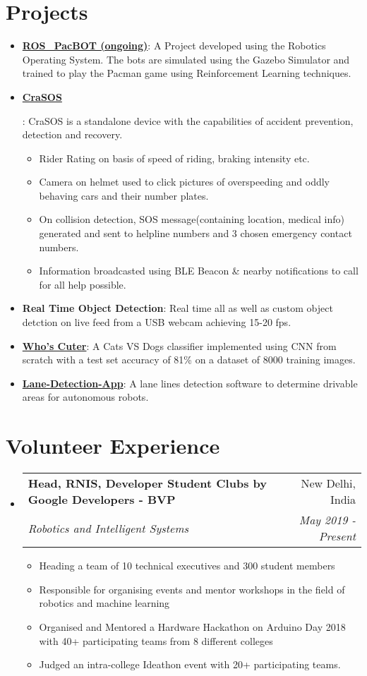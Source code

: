 \documentclass[letterpaper,10pt]{article}
\makeatletter
\newcommand{\resumeItem}[2]{
  \item\small{
    \textbf{#1}{: #2 \vspace{-2pt}}
  }
}
\newcommand{\resumeSubheading}[4]{
  \vspace{-1pt}\item[]
  \begin{tabular*}{0.98\textwidth}{l@{\extracolsep{\fill}}r}
      \hspace{-10pt}\textbf{#1} & #2 \\
      \hspace{-10pt}\textit{\small#3} & \textit{\small #4} \\
    \end{tabular*}\vspace{-5pt}
}
\newcommand{\resumeSubItem}[2]{\resumeItem{#1}{#2}\vspace{-4pt}}
\newcommand{\resumeSubHeadingListStart}{\begin{itemize}[leftmargin=*]}
\newcommand{\resumeSubHeadingListEnd}{\end{itemize}}
\newcommand{\shorterSection}[1]{\vspace{-10pt}\section{#1}}
\makeatother
\begin{document}
\shorterSection{Projects}
  \resumeSubHeadingListStart
    \resumeSubItem{\href{https://github.com/vinayakkgarg/ROS_PacBOT}{\color{blue}ROS\_PacBOT (ongoing)}}
      {A Project developed using the Robotics Operating System. The bots are simulated using the Gazebo Simulator and trained to play the Pacman game using Reinforcement Learning techniques.}
    \resumeSubItem{\href{https://github.com/parulagg27/CraSOS}{\color{blue}CraSOS}}
      {CraSOS is a standalone device with the capabilities of accident prevention, detection and recovery. 
        \vspace{-5pt}
        \begin{itemize}
            \item Rider Rating on basis of speed of riding, braking intensity etc.
            \item Camera on helmet used to click pictures of overspeeding and oddly behaving cars and their number plates.
            \item On collision detection, SOS message(containing location, medical info) generated and sent to helpline numbers and 3 chosen emergency contact numbers.
            \item Information broadcasted using BLE Beacon \& nearby notifications to call for all help possible.
        \end{itemize}
      }
    \resumeSubItem{Real Time Object Detection}
      {Real time all as well as custom object detction on live feed from a USB webcam achieving 15-20 fps.}
    \resumeSubItem{\href{https://github.com/vinayakkgarg/whos-cuter}{\color{blue}Who's Cuter}}
      {A Cats VS Dogs classifier implemented using CNN from scratch with a test set accuracy of 81\% on a dataset of 8000 training images.}
    \resumeSubItem{\href{https://github.com/vinayakkgarg/Lane-Detection-App}{\color{blue}Lane-Detection-App}}
     {A lane lines detection software to determine drivable areas for autonomous robots.}
  \resumeSubHeadingListEnd


\shorterSection{Volunteer Experience}
  \resumeSubHeadingListStart

    \resumeSubheading
      {Head, RNIS, Developer Student Clubs by Google Developers - BVP}{New Delhi, India}
      {Robotics and Intelligent Systems}{May 2019 - Present}
      \vspace{-5pt}
        \begin{itemize}[noitemsep]
            \item Heading a team of 10 technical executives and 300 student members
            \item Responsible for organising events and mentor workshops in the field of robotics and machine learning
            \item Organised and Mentored a Hardware Hackathon on Arduino Day 2018 with 40+ participating teams from 8 different colleges
            \item Judged an intra-college Ideathon event with 20+ participating teams.
            
        \end{itemize}
  \resumeSubHeadingListEnd
\end{document}
